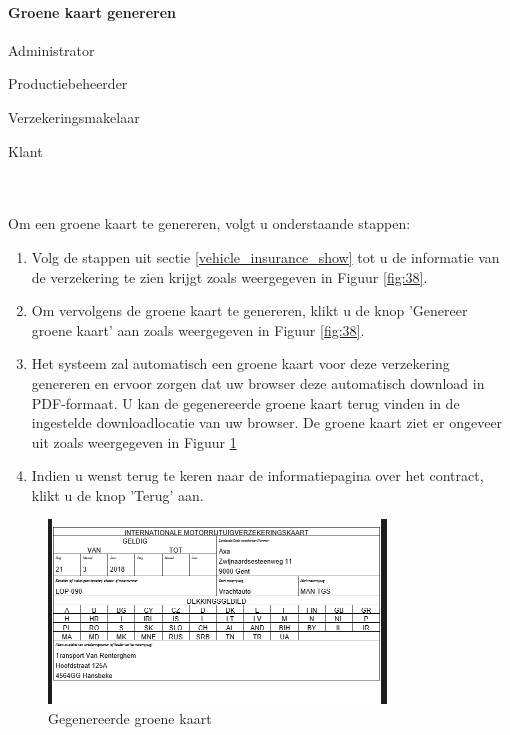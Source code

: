 \documentclass[11pt,openany]{article}
\newcommand{\cmark}{\ding{51}}%
\newcommand{\xmark}{\ding{55}}%
\newcommand{\done}{\rlap{$\square$}{\raisebox{2pt}{\large\hspace{1pt}\cmark}}%
	\hspace{-2.5pt}}
\newcommand{\wontfix}{\rlap{$\square$}{\large\hspace{1pt}\xmark}}
\begin{document}
\paragraph{Groene kaart genereren}
\label{green_card}
\begin{todolist}
	\item[\done] Administrator
	\item[\done] Productiebeheerder
	\item[\done] Verzekeringsmakelaar
	\item[\wontfix] Klant 
\end{todolist}
\\
\\
Om een groene kaart te genereren, volgt u onderstaande stappen:
\begin{enumerate}
	\item Volg de stappen uit sectie \ref{vehicle_insurance_show} tot u de informatie van de verzekering te zien krijgt zoals weergegeven in Figuur \ref{fig:38}.
	\item Om vervolgens de groene kaart te genereren, klikt u de knop 'Genereer groene kaart' aan zoals weergegeven in Figuur \ref{fig:38}.
	\item Het systeem zal automatisch een groene kaart voor deze verzekering genereren en ervoor zorgen dat uw browser deze automatisch download in PDF-formaat. U kan de gegenereerde groene kaart terug vinden in de ingestelde downloadlocatie van uw browser. De groene kaart ziet er ongeveer uit zoals weergegeven in Figuur \ref{fig:45}
	\item Indien u wenst terug te keren naar de informatiepagina over het contract, klikt u de knop 'Terug' aan.
	
\end{enumerate}
\begin{figure}
	\centering
	\includegraphics[width=0.8\textwidth]{img/fig45.png}
	\caption{Gegenereerde groene kaart} 
	\label{fig:45} 
\end{figure}
\end{document}
